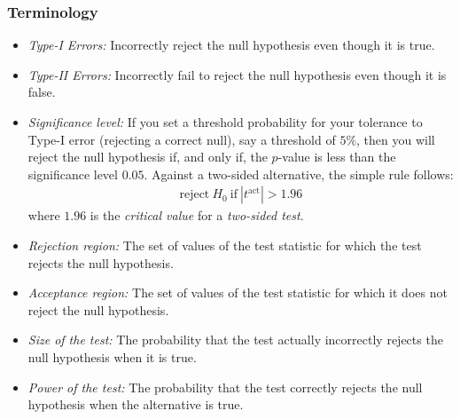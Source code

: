 

\begin{frame}
\frametitle{Terminology}
\begin{itemize}
\item \emph{Type-I Errors:} 
Incorrectly reject the null hypothesis even though it is true.
\item \emph{Type-II Errors:} 
Incorrectly fail to reject the null hypothesis even though it is false.
\item \emph{Significance level:} If you set a threshold probability for your tolerance to Type-I error (rejecting a correct null), say a threshold of $5\%$, then you will reject the null hypothesis if, and only if, the $p$-value is less than the significance level $0.05$. Against a two-sided alternative, the simple rule follows:
\begin{align*}
\text{reject}~ H_0 ~\text{if}~ |t^{\text{act}}| > 1.96
\end{align*}
where $1.96$ is the \emph{critical value} for a \emph{two-sided test}. 
\item \emph{Rejection region:} The set of values of the test statistic for which the test rejects the null hypothesis.
\item \emph{Acceptance region:} The set of values of the test statistic for which it does not reject the null hypothesis. 
\item \emph{Size of the test:} The probability that the test actually incorrectly rejects the null hypothesis when it is true.
\item \emph{Power of the test:} The probability that the test correctly rejects the null hypothesis when the alternative is true.
\end{itemize}
\end{frame}
